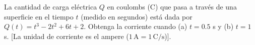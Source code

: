 \item La cantidad de carga eléctrica $Q$ en coulombs (C) que pasa a través de una superficie en el tiempo $t$ (medido en segundos) está dada por $Q(t) = t^3 - 2t^2 + 6t + 2$. Obtenga la corriente cuando (a) $t = 0.5$ s y (b) $t = 1$ s. [La unidad de corriente es el ampere ($1 \, \text{A} = 1 \, \text{C/s}$)].
